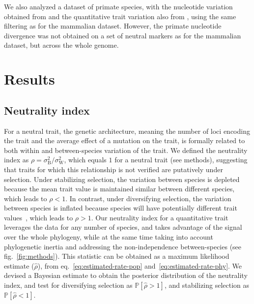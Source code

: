 \documentclass{article}
\newcommand{\proba}{\mathbb{P}}
\newcommand{\RateBetween}{\sigma^2_{\mathrm{B}}}
\newcommand{\RateWhithin}{\sigma^2_{\mathrm{W}}}
\newcommand{\NI}{\rho}
\newcommand{\EstNI}{\widehat{\rho}}
\begin{document}
We also analyzed a dataset of primate species, with the nucleotide variation obtained from \textcite{kuderna_global_2023} and the quantitative trait variation also from \textcite{tsuboi_breakdown_2018}, using the same filtering as for the mammalian dataset.
However, the primate nucleotide divergence was not obtained on a set of neutral markers as for the mammalian dataset, but across the whole genome.

\section*{Results}\label{sec:results}

\subsection*{Neutrality index}

For a neutral trait, the genetic architecture, meaning the number of loci encoding the trait and the average effect of a mutation on the trait, is formally related to both within and between-species variation of the trait.
We defined the neutrality index as $\NI = \RateBetween/\RateWhithin$, which equals $1$ for a neutral trait (see methods), suggesting that traits for which this relationship is not verified are putatively under selection.
Under stabilizing selection, the variation between species is depleted because the mean trait value is maintained similar between different species, which leads to $\NI < 1$.
In contrast, under diversifying selection, the variation between species is inflated because species will have potentially different trait values~\parencite{hansen_stabilizing_1997}, which leads to $\NI > 1$.
Our neutrality index for a quantitative trait leverages the data for any number of species, and takes advantage of the signal over the whole phylogeny, while at the same time taking into account phylogenetic inertia and addressing the non-independence between-species (see fig.~\ref{fig:methods}).
This statistic can be obtained as a maximum likelihood estimate ($\EstNI$), from eq.~\ref{eq:estimated-rate-pop} and~\ref{eq:estimated-rate-phy}.
We devised a Bayesian estimate to obtain the posterior distribution of the neutrality index, and test for diversifying selection as $\proba [\EstNI > 1]$, and stabilizing selection as $\proba [\EstNI < 1]$.
\end{document}
